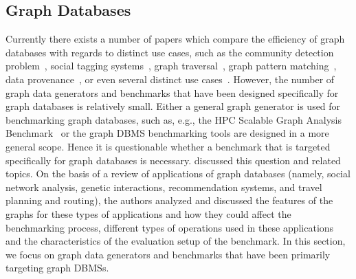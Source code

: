 \subsection{Graph Databases}
\label{sec:generators_GraphDatabases}

Currently there exists a number  of papers which compare the efficiency of graph databases with regards to distinct use cases, such as  the community detection problem~\cite{Beis2015}, social tagging systems~\cite{Giatsoglou2011}, graph traversal~\cite{Ciglan:2012:BTO:2374486.2375242}, graph pattern matching~\cite{Pobiedina2014}, data provenance~\cite{Vicknair:2010:CGD:1900008.1900067}, or even several distinct use cases~\cite{Grossniklaus2013Towar-24253}. However, the number of graph data generators and benchmarks that have been designed specifically for graph databases is relatively small. Either a general graph generator is used for benchmarking graph databases, such as, e.g., the HPC Scalable Graph Analysis Benchmark~\cite{Dominguez-Sal:2010:SGD:1927585.1927590} or the graph DBMS benchmarking tools are designed in a more general scope. Hence it is questionable whether a benchmark  that is targeted specifically for graph databases is necessary. \cite{Dominguez-Sal:2010:DDG:1946050.1946053} discussed this question and related topics. On the basis of a review of applications of graph databases (namely, social network analysis,  genetic interactions, recommendation systems, and travel planning and routing), the authors analyzed and discussed the features of the graphs for these types of applications and how they could affect the benchmarking process, different types of operations used in these applications and the characteristics of the evaluation setup of the benchmark. In this section, we focus on graph data generators and benchmarks that have been primarily targeting graph DBMSs.


